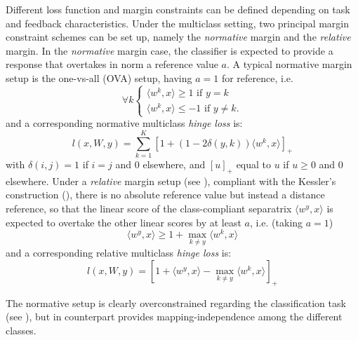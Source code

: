 \documentclass[preprint,12pt,authoryear]{elsarticle}
\begin{document}
Different loss function and margin constraints can be defined depending on task and feedback characteristics. 
Under the multiclass setting, two principal margin constraint schemes can be set up, namely the \emph{normative} margin and the \emph{relative} margin. In the \emph{normative} margin case, the classifier is expected to provide a response that overtakes in norm a reference value $a$. A typical normative margin setup is the one-vs-all (OVA) setup, having  $a = 1$ for reference,  i.e. \begin{equation}\label{eq:OVA}
\forall k \left\{
\begin{array}{l}
\langle w^k, x \rangle \geq 1 \text{ if } y = k \\
\langle w^k, x \rangle \leq -1 \text{ if }y \neq k.
\end{array}
\right. 
\end{equation}
and a corresponding normative multiclass \emph{hinge loss} is:  
\begin{equation}\label{eq:OVA-loss} l(x,W,y) = \sum_{k=1}^K \left[1 + (1 - 2 \delta(y,k)) \langle w^k,x \rangle\right]_+
\end{equation}
with $\delta(i,j) =1$ if $i = j$ and 0 elsewhere, and $[u]_+$ equal to $u$ if $u\geq 0$ and 0 elsewhere.
Under  a \emph{relative} margin setup (see \cite{crammer2003ultraconservative}), compliant with the Kessler's construction (\cite{duda1973pattern}), there is no absolute reference value but instead a distance reference, so that the linear score of the class-compliant separatrix $\langle w^y, x\rangle$ is expected to overtake  the other linear scores by at least $a$, i.e. (taking $a=1$)
$$ \langle w^y, x \rangle \geq 1 + \max_{k \neq y} \langle w^k, x \rangle  $$
and a corresponding relative multiclass \emph{hinge loss} is:
$$ l (x,W,y) =  \left[ 1 +  \langle w^y, x \rangle - \max_{k \neq y} \langle w^k, x\rangle\right]_+$$

The normative setup is clearly overconstrained regarding the classification task (see \cite{crammer2003ultraconservative}), but in counterpart provides mapping-independence among the different classes.

\end{document}
